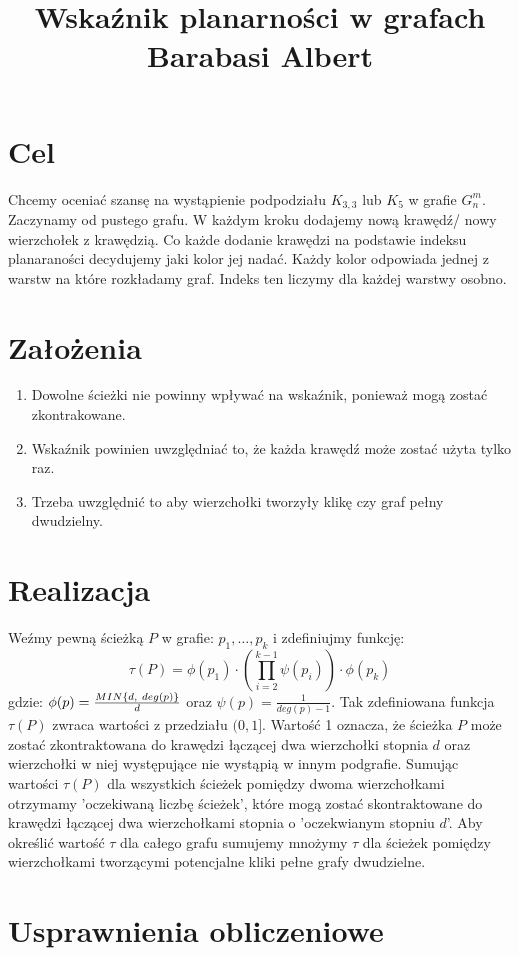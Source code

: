 \documentclass{article}
\title{ Wskaźnik planarności w grafach Barabasi Albert }
\author{}
\date{}
\begin{document}
\maketitle

\section{Cel}
Chcemy oceniać szansę na wystąpienie podpodziału $K_{3,3}$ lub $K_5$ w grafie $G^m_n$.
Zaczynamy od pustego grafu. W każdym kroku dodajemy nową krawędź/ nowy wierzchołek z krawędzią.
Co każde dodanie krawędzi na podstawie indeksu planaraności decydujemy jaki kolor jej nadać. Każdy kolor odpowiada jednej z warstw na które rozkładamy graf.
Indeks ten liczymy dla każdej warstwy osobno.

\section{Założenia}
\begin{enumerate}
    \item Dowolne ścieżki nie powinny wpływać na wskaźnik, ponieważ mogą zostać zkontrakowane.
    \item Wskaźnik powinien uwzględniać to, że każda krawędź może zostać użyta tylko raz.
    \item Trzeba uwzględnić to aby wierzchołki tworzyły klikę czy graf pełny dwudzielny.
\end{enumerate}

\section{Realizacja}
Weźmy pewną ścieżką $P$ w grafie: $p_1, \ldots, p_k$ i zdefiniujmy funkcję:
\begin{dmath}
    \tau(P) = \phi(p_1) \cdot (\prod_{i=2}^{k-1} \psi(p_i)) \cdot \phi(p_k)
\end{dmath}
gdzie: $\phi(p) = \frac{MIN\{d, \\\ deg(p)\}}{d}$ oraz $\psi(p) = \frac{1}{deg(p) - 1}$.
\newline
Tak zdefiniowana funkcja $\tau(P)$ zwraca wartości z przedziału $(0, 1]$. Wartość 1 oznacza, że ścieżka $P$ może zostać zkontraktowana do krawędzi łączącej dwa wierzchołki stopnia $d$ oraz wierzchołki w niej występujące nie wystąpią w innym podgrafie.
\newline
Sumując wartości $\tau(P)$ dla wszystkich ścieżek pomiędzy dwoma wierzchołkami otrzymamy 'oczekiwaną liczbę ścieżek', które mogą zostać skontraktowane do krawędzi łączącej dwa wierzchołkami stopnia o 'oczekwianym stopniu $d$'.
\newline
Aby określić wartość $\tau$ dla całego grafu sumujemy mnożymy $\tau$ dla ścieżek pomiędzy wierzchołkami tworzącymi potencjalne kliki pełne grafy dwudzielne.

\section{Usprawnienia obliczeniowe}
\end{document}
